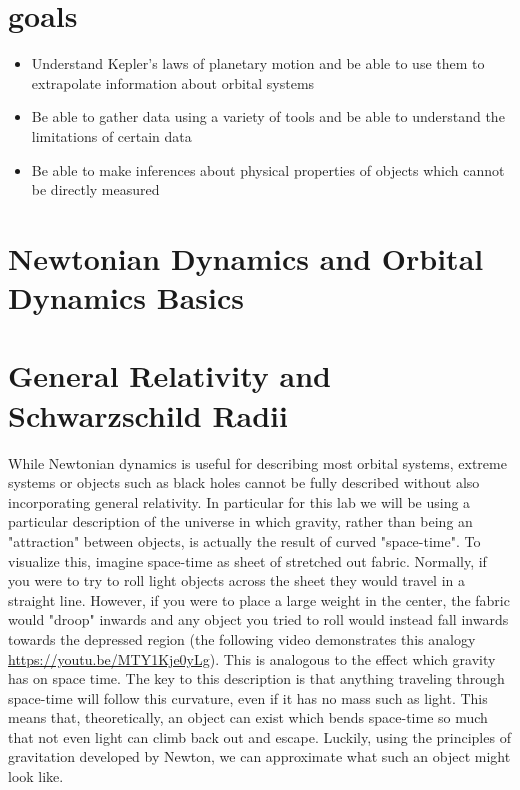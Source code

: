 \section{goals}
\begin{itemize}
	\item Understand Kepler's laws of planetary motion and be able to use them to extrapolate information about orbital systems
	\item Be able to gather data using a variety of tools and be able to understand the limitations of certain data
	\item Be able to make inferences about physical properties of objects which cannot be directly measured
\end{itemize}

\section{Newtonian Dynamics and Orbital Dynamics Basics}


\section{General Relativity and Schwarzschild Radii}

While Newtonian dynamics is useful for describing most orbital systems, extreme systems or objects such as black holes cannot be fully described without also incorporating general relativity. In particular for this lab we will be using a particular description of the universe in which gravity, rather than being an "attraction" between objects, is actually the result of curved "space-time". To visualize this, imagine space-time as sheet of stretched out fabric. Normally, if you were to try to roll light objects across the sheet they would travel in a straight line. However, if you were to place a large weight in the center, the fabric would "droop" inwards and any object you tried to roll would instead fall inwards towards the depressed region (the following video demonstrates this analogy \url{https://youtu.be/MTY1Kje0yLg}). This is analogous to the effect which gravity has on space time. The key to this description is that anything traveling through space-time will follow this curvature, even if it has no mass such as light. This means that, theoretically, an object can exist which bends space-time so much that not even light can climb back out and escape. Luckily, using the principles of gravitation developed by Newton, we can approximate what such an object might look like. 

